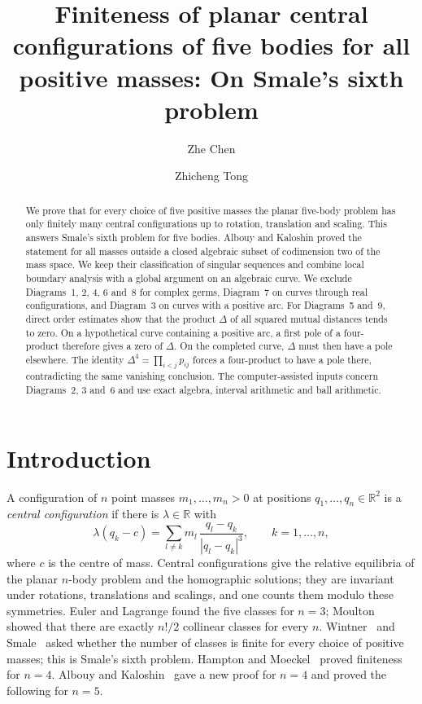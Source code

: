 \documentclass[11pt]{amsart}
\title[Five-body central configurations]{Finiteness of planar central configurations of five
bodies for all positive masses: On Smale's sixth problem}
\author{Zhe Chen}
\author{Zhicheng Tong}
\theoremstyle{definition}
\theoremstyle{remark}
\newcommand{\R}{\mathbb{R}}
\begin{document}
\begin{abstract}
{
We prove that for every choice of five positive masses the planar five-body problem has only
finitely many central configurations up to rotation, translation and scaling.  This answers
Smale's sixth problem for five bodies.  Albouy and Kaloshin proved the statement for all masses
outside a closed algebraic subset of codimension two of the mass space.  We keep their
classification of singular sequences and combine local boundary analysis with a global
argument on an algebraic curve.  We exclude Diagrams~1, 2, 4, 6 and~8 for complex germs,
Diagram~7 on curves through real configurations, and Diagram~3 on curves with a positive arc.  For Diagrams~5 and~9, direct order estimates show that the product
$\Delta$ of all squared mutual distances tends to zero.  On a hypothetical curve containing a
positive arc, a first pole of a four-product therefore gives a zero of $\Delta$.  On the
completed curve, $\Delta$ must then have a pole elsewhere.  The identity
$\Delta^4=\prod_{i<j}p_{ij}$ forces a four-product to have a pole there, contradicting the same
vanishing conclusion.  The computer-assisted inputs concern Diagrams~2, 3 and~6 and use exact
algebra, interval arithmetic and ball arithmetic.
}
\end{abstract}

\maketitle

\tableofcontents


\section{Introduction}\label{sec:intro}

A configuration of $n$ point masses $m_1,\dots,m_n>0$ at positions $q_1,\dots,q_n\in\R^2$ is a
\emph{central configuration} if there is $\lambda\in\R$ with
\[
  \lambda (q_k-c) = \sum_{l\neq k} m_l\,\frac{q_l-q_k}{|q_l-q_k|^3},\qquad k=1,\dots,n,
\]
where $c$ is the centre of mass.  Central configurations give the relative equilibria of the
planar $n$-body problem and the homographic solutions; they are invariant under rotations,
translations and scalings, and one counts them modulo these symmetries.  Euler and Lagrange
found the five classes for $n=3$; Moulton~\cite{Moulton} showed that there are exactly $n!/2$
collinear classes for every $n$.  Wintner~\cite{Wintner} and Smale~\cite{Smale} asked whether
the number of classes is finite for every choice of positive masses; this is Smale's sixth
problem.  Hampton and Moeckel~\cite{HM} proved finiteness for $n=4$.  Albouy and
Kaloshin~\cite{AK} gave a new proof for $n=4$ and proved the following for $n=5$.
\end{document}
